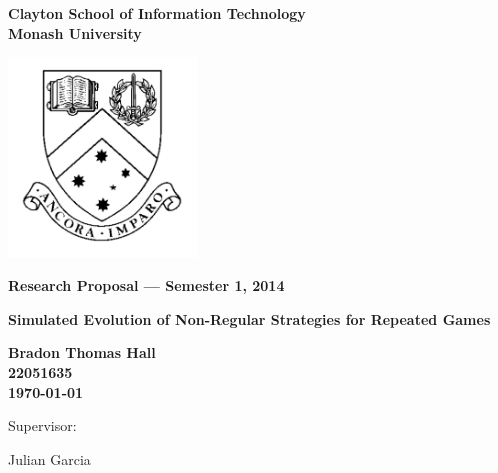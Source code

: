 \documentclass[a4paper,11pt]{article}
\begin{document}
\thispagestyle{empty} %
\renewcommand{\thepage}{\roman{page}}

\begin{spacing}{1.5}
\begin{center}
{\Large \bfseries
Clayton School of Information Technology\\
Monash University}

\vspace*{30mm}

\includegraphics[width=5cm]{MonashCrest}

\vspace*{15mm}

{\large \bfseries
Research Proposal --- Semester 1, 2014
}

\vspace*{10mm}

{\LARGE \bfseries
Simulated Evolution of Non-Regular Strategies for Repeated Games
}

\vspace*{20mm}

{\large \bfseries
Bradon Thomas Hall \\22051635\\
\today

\vspace*{20mm}

Supervisor: \parbox[t]{50mm}{Julian Garcia}
}

\end{center}
\end{spacing}

\newpage

\tableofcontents

\newpage
\setcounter{page}{1}
\renewcommand{\thepage}{\arabic{page}}
\end{document}
